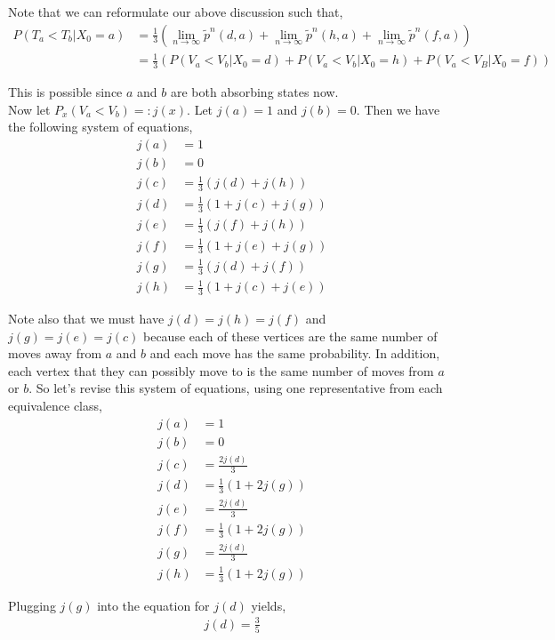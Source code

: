 \documentclass[12pt]{article}
\begin{document}
Note that we can reformulate our above discussion such that,
\begin{align*}
P(T_a < T_b | X_0 = a) &= \frac{1}{3} (\lim_{n \to \infty} \tilde{p}^n(d, a) + \lim_{n \to \infty} \tilde{p}^n(h, a) + \lim_{n \to \infty} \tilde{p}^n(f, a))\\
&= \frac{1}{3} (P(V_a < V_b | X_0 = d) + P(V_a < V_b | X_0 = h) + P(V_a < V_B | X_0 = f))
\end{align*}

This is possible since $a$ and $b$ are both absorbing states now.\\

Now let $P_x(V_a < V_b) =: j(x)$. Let $j(a) = 1$ and $j(b) = 0$. Then we have the following system of equations,
\begin{align*}
j(a) &= 1\\
j(b) &= 0\\
j(c) &= \frac{1}{3}(j(d) + j(h))\\
j(d) &= \frac{1}{3}(1 + j(c) + j(g))\\
j(e) &= \frac{1}{3}(j(f) + j(h))\\
j(f) &= \frac{1}{3}(1 + j(e) + j(g))\\
j(g) &= \frac{1}{3}(j(d) + j(f))\\
j(h) &= \frac{1}{3}(1 + j(c) + j(e))
\end{align*}

Note also that we must have $j(d) = j(h) = j(f)$ and $j(g) = j(e) = j(c)$ because each of these vertices are the same number of moves away from $a$ and $b$ and each move has the same probability. In addition, each vertex that they can possibly move to is the same number of moves from $a$ or $b$. So let's revise this system of equations, using one representative from each equivalence class,
\begin{align*}
j(a) &= 1\\
j(b) &= 0\\
j(c) &= \frac{2j(d)}{3}\\
j(d) &= \frac{1}{3}(1 + 2j(g))\\
j(e) &= \frac{2j(d)}{3}\\
j(f) &= \frac{1}{3}(1 + 2j(g))\\
j(g) &= \frac{2j(d)}{3}\\
j(h) &= \frac{1}{3}(1 + 2j(g))
\end{align*}

Plugging $j(g)$ into the equation for $j(d)$ yields,
\begin{align*}
j(d) = \frac{3}{5}
\end{align*}
\end{document}
